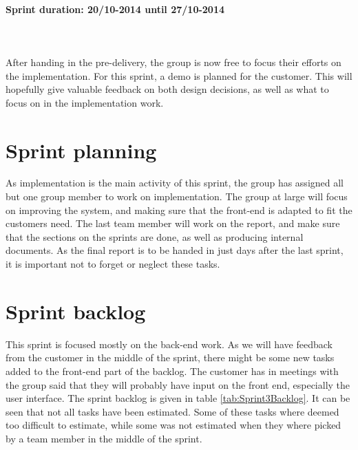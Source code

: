 \documentclass[11pt,a4paper,titlepage,oneside]{report}
\begin{document}
\paragraph{Sprint duration: 20/10-2014 until 27/10-2014} \hfill \\
\\
\noindent
After handing in the \gls{pre-delivery}, the group is now free to focus their efforts on the implementation. For this sprint, a demo is planned for the customer. This will hopefully give valuable feedback on both design decisions, as well as what to focus on in the implementation work.

\section{Sprint planning}
As implementation is the main activity of this sprint, the group has assigned all but one group member to work on implementation. The group at large will focus on improving the system, and making sure that the \gls{front-end} is adapted to fit the customers need. The last team member will work on the report, and make sure that the sections on the sprints are done, as well as producing internal documents. As the final report is to be handed in just days after the last sprint, it is important not to forget or neglect these tasks. 

\section{Sprint backlog}
This sprint is focused mostly on the \gls{back-end} work. As we will have feedback from the customer in the middle of the sprint, there might be some new tasks added to the \gls{front-end} part of the backlog. The customer has in meetings with the group said that they will probably have input on the front end, especially the user interface. The sprint backlog is given in table \ref{tab:Sprint3Backlog}. It can be seen that not all tasks have been estimated. Some of these tasks where deemed too difficult to estimate, while some was not estimated when they where picked by a team member in the middle of the sprint. 
\end{document}
